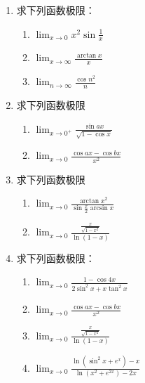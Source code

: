 \documentclass[12pt, a4paper]{article}
\begin{document}
\begin{enumerate}
    \item 求下列函数极限：
    \begin{enumerate}
        \item $ \lim_{x\to0}x^{2}\sin\frac{1}{x} $
        \item $ \lim_{x\to\infty}\frac{\arctan x}{x} $
        \item $ \lim_{n\to\infty}\frac{\cos n^{2}}{n} $
    \end{enumerate}
    \item 求下列函数极限
    \begin{enumerate}
        \item $ \lim_{x \to 0^{+}} \frac{\sin ax}{\sqrt{1 - \cos x}} $
        \item $ \lim_{x \to 0} \frac{\cos ax - \cos bx}{x^{2}} $
    \end{enumerate}

    \item 求下列函数极限
    \begin{enumerate}
        \item $ \lim_{x\to0} \frac{\arctan x^{2}}{\sin\frac{x}{2}\arcsin x} $
        \item $ \lim_{x \to 0} \frac{\frac{x}{\sqrt{1-x^{2}}}}{\ln(1-x)} $
    \end{enumerate}

    \item 求下列函数极限：
    \begin{enumerate}
        \item $ \lim_{x\to0}\frac{1-\cos 4x}{2\sin^{2}x+x\tan^{2}x} $
        \item $ \lim_{x \to 0} \frac{\cos ax - \cos bx}{x^{2}} $
        \item $ \lim_{x\to0}\frac{\frac{x}{\sqrt{1-x^{2}}}}{\ln(1-x)} $
        \item $ \lim_{x\to0}\frac{\ln(\sin^{2}x+e^{x})-x}{\ln(x^{2}+e^{2x})-2x} $
    \end{enumerate}
\end{enumerate}
\end{document}
